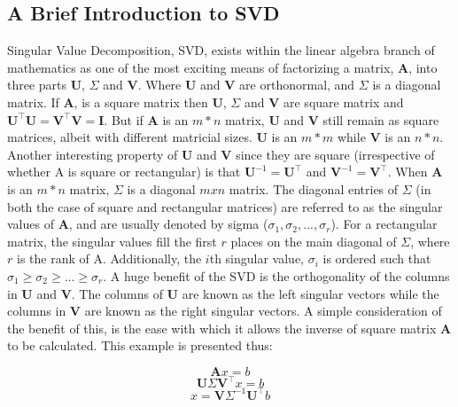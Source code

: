 \documentclass[preprint,12pt]{elsarticle}
\newcommand{\JGnote}[1]{\fbox{\parbox{\textwidth}{ \color{red} JG Note $\Rightarrow$ #1}}}
\begin{document}
\subsection{A Brief Introduction to SVD}\label{subsection:svd_brief}

Singular Value Decomposition, SVD, \JGnote{ioioioiok} exists within the linear algebra branch of mathematics as one of the most exciting means of factorizing a matrix, $\mathbf{A}$, into three parts $\mathbf{U}$, $\Sigma$ and $\mathbf{V}$. Where $\mathbf{U}$ and $\mathbf{V}$ are orthonormal, and $\Sigma$ is a diagonal matrix. If $\mathbf{A}$, is a square matrix then $\mathbf{U}$, $\Sigma$ and $\mathbf{V}$ are square matrix and $\mathbf{U}^{\intercal}\mathbf{U} = \mathbf{V}^{\intercal}\mathbf{V} = \mathbf{I}$. But if $\mathbf{A}$ is an $m * n$ matrix, $\mathbf{U}$ and $\mathbf{V}$ still remain as square matrices, albeit with different matricial sizes. $\mathbf{U}$ is an $m * m$ while $\mathbf{V}$ is an $n * n$. Another interesting property of $\mathbf{U}$ and $\mathbf{V}$ since they are square (irrespective of whether A is square or rectangular) is that $\mathbf{U}^{-1} = \mathbf{U}^{\intercal}$ and $\mathbf{V}^{-1} = \mathbf{V}^{\intercal}$. When $\mathbf{A}$ is an $m * n$ matrix, $\Sigma$ is a diagonal $m x n$ matrix. The diagonal entries of $\Sigma$ (in both the case of square and rectangular matrices) are referred to as the singular values of $\mathbf{A}$, and are usually denoted by sigma ($\sigma_{1}, \sigma_{2},..., \sigma_{r}$). For a rectangular matrix, the singular values fill the first $r$ places on the main diagonal of $\Sigma$, where $r$ is the rank of A. Additionally, the $i$th singular value, $\sigma_{i}$ is ordered such that $\sigma_{1} \geq \sigma_{2} \geq ...\geq \sigma_{r}$. A huge benefit of the SVD is the orthogonality of the columns in $\mathbf{U}$ and $\mathbf{V}$. The columns of $\mathbf{U}$ are known as the left singular vectors while the columns in $\mathbf{V}$ are known as the right singular vectors. A simple consideration of the benefit of this, is the ease with which it allows the inverse of square matrix $\mathbf{A}$ to be calculated. This example is presented thus:

\begin{equation}
 \mathbf{A}x = b
\end{equation}
\begin{equation}
 \mathbf{U} \Sigma \mathbf{V}^{\intercal} x = b
\end{equation}
\begin{equation}
 x = \mathbf{V} \Sigma^{-1} \mathbf{U}^{\intercal} b
\end{equation}
\end{document}

